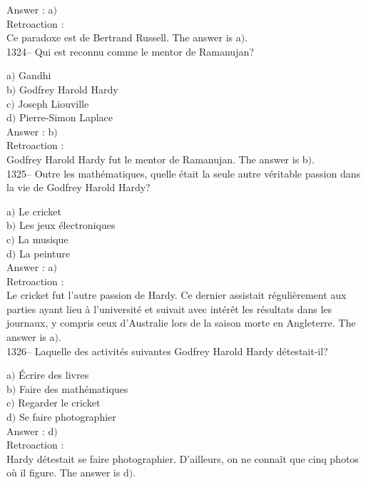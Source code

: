﻿\documentclass[letterpaper, 12pt]{article}
\begin{document}
Answer : a$)$\\

Retroaction : \\
Ce paradoxe est de Bertrand Russell.
The answer is  a$)$.\\

1324-- Qui est reconnu comme le mentor de Ramanujan?

a$)$ Gandhi \\
b$)$ Godfrey Harold Hardy \\
c$)$ Joseph Liouville \\
d$)$ Pierre-Simon Laplace \\

Answer : b$)$\\

Retroaction : \\
Godfrey Harold Hardy fut le mentor de Ramanujan.
The answer is  b$)$.\\

1325-- Outre les math\'ematiques, quelle \'etait la seule autre
v\'eritable passion dans la vie de Godfrey Harold Hardy?

a$)$ Le cricket \\
b$)$ Les jeux \'electroniques \\
c$)$ La musique \\
d$)$ La peinture \\

Answer : a$)$\\

Retroaction : \\
Le cricket fut l'autre passion de Hardy. Ce dernier assistait
r\'eguli\`erement aux parties ayant lieu \`a l'universit\'e et
suivait avec int\'er\^et les r\'esultats dans les journaux, y
compris ceux d'Australie lors de la saison morte en Angleterre.
The answer is  a$)$.\\

1326-- Laquelle des activit\'es suivantes Godfrey Harold Hardy
d\'etestait-il?

a$)$ \'Ecrire des livres \\
b$)$ Faire des math\'ematiques \\
c$)$ Regarder le cricket \\
d$)$ Se faire photographier\\

Answer : d$)$\\

Retroaction : \\
Hardy d\'etestait se faire photographier. D'ailleurs, on ne
conna\^it que cinq photos o\`u il figure.
The answer is  d$)$.\\
\end{document}
